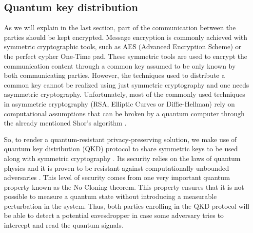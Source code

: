 \subsection{Quantum key distribution}

As we will explain in the last section, part of the communication between the parties should be kept encrypted. Message encryption is commonly achieved with symmetric cryptographic tools, such as AES (Advanced Encryption Scheme) or the perfect cypher One-Time pad. These symmetric tools are used to encrypt the communication content through a common key assumed to be only known by both communicating parties. However, the techniques used to distribute a common key cannot be realized using just symmetric cryptography and one needs asymmetric cryptography. Unfortunately, most of the commonly used techniques in asymmetric cryptography (RSA, Elliptic Curves or Diffie-Hellman) rely on computational assumptions that can be broken by a quantum computer through the already mentioned Shor's algorithm \cite{Shor1995}.

So, to render a quantum-resistant privacy-preserving solution, we make use of quantum key distribution (QKD) protocol to share symmetric keys to be used along with symmetric cryptography \cite{Pirandola2020, Almeida2020, Silva2019, Almeida2021}. Its security relies on the laws of quantum physics and it is proven to be resistant against computationally unbounded adversaries \cite{Renner05, Tomamichel2017}. This level of security comes from one very important quantum property known as the No-Cloning theorem. This property ensures that it is not possible to measure a quantum state without introducing a measurable perturbation in the system. Thus, both parties enrolling in the QKD protocol will be able to detect a potential eavesdropper in case some adversary tries to intercept and read the quantum signals.


%



